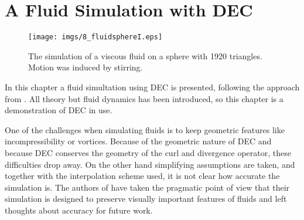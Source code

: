 \chapter{A Fluid Simulation with DEC}

\begin{figure}[h]%
\begin{center}
\texttt{[image: imgs/8\_fluidsphereI.eps]}%
\end{center}
\caption{The simulation of a viscous fluid on a sphere with 1920 triangles. Motion was induced by stirring.}%
\label{fig:8_fluidsphere}%
\end{figure}

In this chapter a fluid simultation using DEC is presented, following the approach from . 
All theory but fluid dynamics has been introduced, so this chapter is a demonstration of DEC in use. 

One of the challenges when simulating fluids is to keep geometric features like incompressibility or vortices. Because of the geometric nature of DEC and because DEC conserves the geometry of the curl and divergence operator, these difficulties drop away. On the other hand simplifying assumptions are taken, and together with the interpolation scheme used, it is not clear how accurate the simulation is. The authors of  have taken the pragmatic point of view that their simulation is designed to preserve visually important features of fluids and left thoughts about accuracy for future work. 

